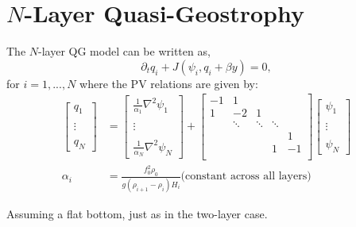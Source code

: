 \documentclass[12pt]{article}
\begin{document}
\section{$N$-Layer Quasi-Geostrophy}{
    The $N$-layer QG model can be written as,
    $$
    \partial_t q_i + J(\psi_i, q_i + \beta y) = 0,
    $$
    for $i=1,...,N$ where the PV relations are given by:
    \begin{align*}
        \left[\begin{array}{c}
        q_1 \\
        \\
        \vdots \\
        \\
        q_N
        \end{array}\right]
        &=
        \left[\begin{array}{c}
        \frac{1}{\alpha_1}\nabla^2 \psi_1 \\
        \\
        \vdots \\
        \\
        \frac{1}{\alpha_N}\nabla^2 \psi_N
        \end{array}\right]
        +
        \left[\begin{array}{ccccc}
        -1 & 1 & & & \\
        1 & -2 & 1 & & \\
        & \ddots & \ddots & \ddots & \\
        & & & & 1 \\
        & & & 1 & -1\\
        \end{array}\right]
        \left[\begin{array}{c}
        \psi_1 \\
        \\
        \vdots \\
        \\
        \psi_N
        \end{array}\right] \\
        \alpha_i &= \frac{f_0^2 \rho_0}{g (\rho_{i+1} - \rho_i) H_i} \text{(constant across all layers)}
    \end{align*}

    Assuming a flat bottom, just as in the two-layer case.

}
\end{document}
